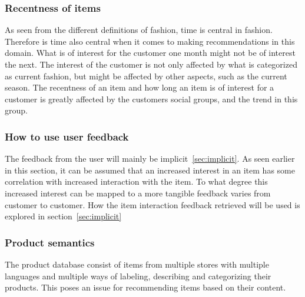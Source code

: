 \subsubsection{Recentness of items}
  As seen from the different definitions of fashion, time is central in fashion.
  Therefore is time also central when it comes to making recommendations in this
  domain.  What is of interest for the customer one month might not be of
  interest the next.  The interest of the customer is not only affected by what
  is categorized as current fashion, but might be affected by other aspects, such
  as the current season.  The recentness of an item and how long an item is of
  interest for a customer is greatly affected by the customers social groups, and
  the trend in this group.

\subsubsection{How to use user feedback}
  The feedback from the user will mainly be implicit~\ref{sec:implicit}.  As seen
  earlier in this section, it can be assumed that an increased interest in an
  item has some correlation with increased interaction with the item.  To what
  degree this increased interest can be mapped to a more tangible feedback
  varies from customer to customer.
  How the item interaction feedback retrieved will be used is explored in section~\ref{sec:implicit}


\subsubsection{Product semantics}
  The product database consist of items from multiple stores with multiple
  languages and multiple ways of labeling, describing and categorizing their
  products.  This poses an issue for recommending items based on their content.


